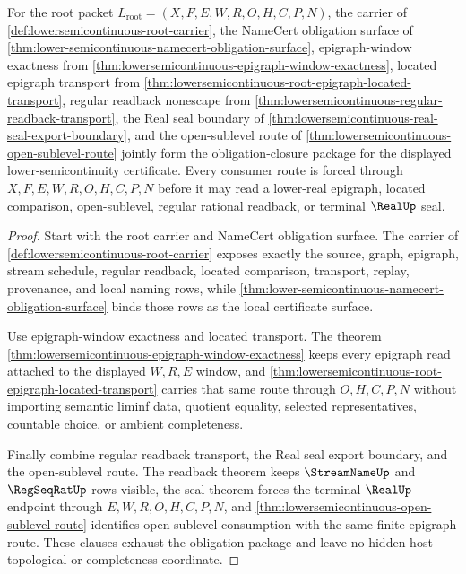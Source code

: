 \begin{theorem}
\label{thm:lowersemicontinuous-obligation-closure-route}
For the root packet $L_{\mathrm{root}}=(X,F,E,W,R,O,H,C,P,N)$, the carrier of \autoref{def:lowersemicontinuous-root-carrier}, the NameCert obligation surface of \autoref{thm:lower-semicontinuous-namecert-obligation-surface}, epigraph-window exactness from \autoref{thm:lowersemicontinuous-epigraph-window-exactness}, located epigraph transport from \autoref{thm:lowersemicontinuous-root-epigraph-located-transport}, regular readback nonescape from \autoref{thm:lowersemicontinuous-regular-readback-transport}, the Real seal boundary of \autoref{thm:lowersemicontinuous-real-seal-export-boundary}, and the open-sublevel route of \autoref{thm:lowersemicontinuous-open-sublevel-route} jointly form the obligation-closure package for the displayed lower-semicontinuity certificate. Every consumer route is forced through $X,F,E,W,R,O,H,C,P,N$ before it may read a lower-real epigraph, located comparison, open-sublevel, regular rational readback, or terminal $\RealUp$ seal.
\end{theorem}
\begin{proof}
Start with the root carrier and NameCert obligation surface. The carrier of \autoref{def:lowersemicontinuous-root-carrier} exposes exactly the source, graph, epigraph, stream schedule, regular readback, located comparison, transport, replay, provenance, and local naming rows, while \autoref{thm:lower-semicontinuous-namecert-obligation-surface} binds those rows as the local certificate surface.

Use epigraph-window exactness and located transport. The theorem \autoref{thm:lowersemicontinuous-epigraph-window-exactness} keeps every epigraph read attached to the displayed $W,R,E$ window, and \autoref{thm:lowersemicontinuous-root-epigraph-located-transport} carries that same route through $O,H,C,P,N$ without importing semantic liminf data, quotient equality, selected representatives, countable choice, or ambient completeness.

Finally combine regular readback transport, the Real seal export boundary, and the open-sublevel route. The readback theorem keeps $\StreamNameUp$ and $\RegSeqRatUp$ rows visible, the seal theorem forces the terminal $\RealUp$ endpoint through $E,W,R,O,H,C,P,N$, and \autoref{thm:lowersemicontinuous-open-sublevel-route} identifies open-sublevel consumption with the same finite epigraph route. These clauses exhaust the obligation package and leave no hidden host-topological or completeness coordinate.
\end{proof}

